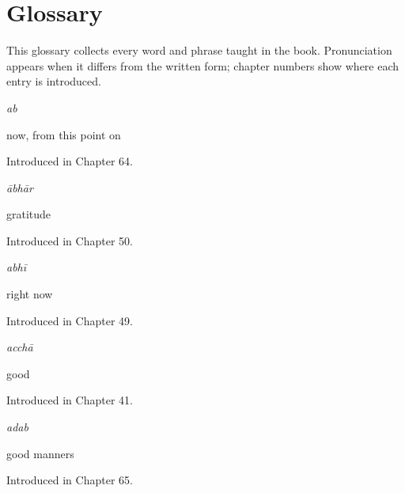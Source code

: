 
\chapter*{Glossary}

This glossary collects every word and phrase taught in the book. Pronunciation appears when it differs from the written form; chapter numbers show where each entry is introduced.

\noindent\begin{minipage}[t]{\linewidth}
\raggedright
\textbf{}\enspace\emph{ab}\par
\small now, from this point on\par
\footnotesize Introduced in Chapter 64.
\end{minipage}\par\medskip

\noindent\begin{minipage}[t]{\linewidth}
\raggedright
\textbf{}\enspace\emph{ābhār}\par
\small gratitude\par
\footnotesize Introduced in Chapter 50.
\end{minipage}\par\medskip

\noindent\begin{minipage}[t]{\linewidth}
\raggedright
\textbf{}\enspace\emph{abhī}\par
\small right now\par
\footnotesize Introduced in Chapter 49.
\end{minipage}\par\medskip

\noindent\begin{minipage}[t]{\linewidth}
\raggedright
\textbf{}\enspace\emph{acchā}\par
\small good\par
\footnotesize Introduced in Chapter 41.
\end{minipage}\par\medskip

\noindent\begin{minipage}[t]{\linewidth}
\raggedright
\textbf{}\enspace\emph{adab}\par
\small good manners\par
\footnotesize Introduced in Chapter 65.
\end{minipage}\par\medskip

